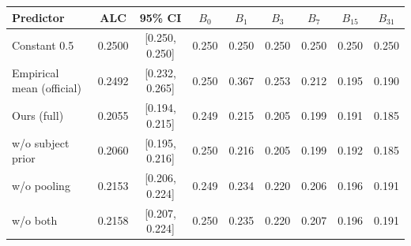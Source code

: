 \begin{tabular}{lcccccccc}
\toprule
Predictor & ALC & 95\% CI & $B_0$ & $B_1$ & $B_3$ & $B_7$ & $B_{15}$ & $B_{31}$ \\
\midrule
Constant 0.5 & 0.2500 & [0.250, 0.250] & 0.250 & 0.250 & 0.250 & 0.250 & 0.250 & 0.250 \\
Empirical mean (official) & 0.2492 & [0.232, 0.265] & 0.250 & 0.367 & 0.253 & 0.212 & 0.195 & 0.190 \\
\midrule
Ours (full) & 0.2055 & [0.194, 0.215] & 0.249 & 0.215 & 0.205 & 0.199 & 0.191 & 0.185 \\
\quad w/o subject prior & 0.2060 & [0.195, 0.216] & 0.250 & 0.216 & 0.205 & 0.199 & 0.192 & 0.185 \\
\quad w/o pooling & 0.2153 & [0.206, 0.224] & 0.249 & 0.234 & 0.220 & 0.206 & 0.196 & 0.191 \\
\quad w/o both & 0.2158 & [0.207, 0.224] & 0.250 & 0.235 & 0.220 & 0.207 & 0.196 & 0.191 \\
\bottomrule
\end{tabular}
